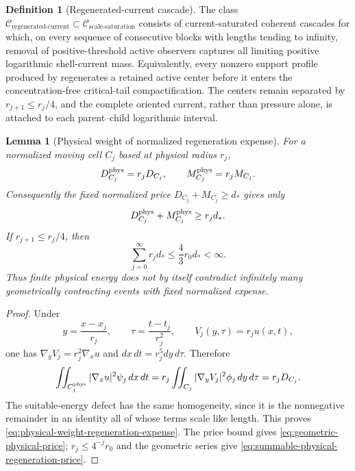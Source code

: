 \documentclass[11pt]{amsart}
\numberwithin{equation}{section}
\theoremstyle{plain}
\newtheorem{lemma}[lemma]{Lemma}
\theoremstyle{definition}
\newtheorem{definition}[definition]{Definition}
\theoremstyle{remark}
\newcommand{\Csat}{\mathcal C_{\mathrm{scale\text{-}saturation}}}
\newcommand{\Cregen}{\mathcal C_{\mathrm{regenerated\text{-}current}}}
\begin{document}
\begin{definition}[Regenerated-current cascade]
\label{def:regenerated-current-cascade}
The class \(\Cregen\subset\Csat\) consists of current-saturated coherent
cascades for which, on every sequence of consecutive blocks with lengths
tending to infinity, removal of positive-threshold active observers captures
all limiting positive logarithmic shell-current mass.  Equivalently, every
nonzero support profile produced by
 regenerates a retained active
center before it enters the concentration-free critical-tail
compactification.  The centers remain separated by
\(r_{j+1}\le r_j/4\), and the complete oriented current, rather than pressure
alone, is attached to each parent--child logarithmic interval.
\end{definition}

\begin{lemma}[Physical weight of normalized regeneration expense]
\label{lem:physical-weight-regeneration-expense}
For a normalized moving cell \(C_j\) based at physical radius \(r_j\),
\begin{equation}\label{eq:physical-weight-regeneration-expense}
 D_{C_j}^{\rm phys}=r_jD_{C_j},
 \qquad M_{C_j}^{\rm phys}=r_jM_{C_j}.
\end{equation}
Consequently the fixed normalized price
\(D_{C_j}+M_{C_j}\ge d_*\) gives only
\begin{equation}\label{eq:geometric-physical-price}
 D_{C_j}^{\rm phys}+M_{C_j}^{\rm phys}\ge r_jd_*.
\end{equation}
If \(r_{j+1}\le r_j/4\), then
\begin{equation}\label{eq:summable-physical-regeneration-price}
 \sum_{j=0}^{\infty}r_jd_*
 \le \frac43r_0d_*<\infty.
\end{equation}
Thus finite physical energy does not by itself contradict infinitely many
geometrically contracting events with fixed normalized expense.
\end{lemma}

\begin{proof}
Under
\[
 y=\frac{x-x_j}{r_j},\qquad
 \tau=\frac{t-t_j}{r_j^2},\qquad
 V_j(y,\tau)=r_ju(x,t),
\]
one has \(\nabla_yV_j=r_j^2\nabla_xu\) and
\(dx\,dt=r_j^5dy\,d\tau\).  Therefore
\[
 \iint_{C_j^{\rm phys}}|\nabla_xu|^2\psi_j\,dx\,dt
 =r_j\iint_{C_j}|\nabla_yV_j|^2\phi_j\,dy\,d\tau
 =r_jD_{C_j}.
\]
The suitable-energy defect has the same homogeneity, since it is the
nonnegative remainder in an identity all of whose terms scale like length.
This proves \eqref{eq:physical-weight-regeneration-expense}.  The price bound
gives \eqref{eq:geometric-physical-price}; \(r_j\le4^{-j}r_0\) and the
geometric series give \eqref{eq:summable-physical-regeneration-price}.
\end{proof}
\end{document}
